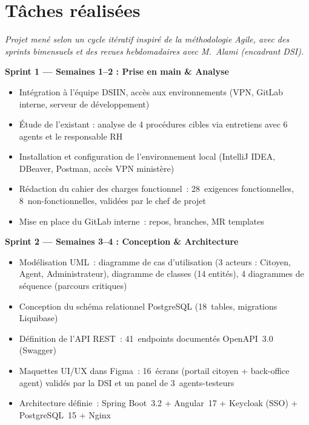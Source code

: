 \documentclass[a4paper,11pt]{article}
\begin{document}
\clearpage

\section{T\^{a}ches r\'{e}alis\'{e}es}
\label{sec:taches}

{\small\color{InstitGrey}\itshape
Projet men\'{e} selon un cycle it\'{e}ratif inspir\'{e} de la m\'{e}thodologie Agile,
avec des sprints bimensuels et des revues hebdomadaires avec M.~Alami (encadrant DSI).}

\vspace{0.8em}

\begin{mdframed}[style=SprintBox]
{\sffamily\bfseries\color{InstitBlue}
  Sprint 1 --- Semaines 1--2 : Prise en main \& Analyse}
\begin{itemize}
  \item Int\'{e}gration \`{a} l'\'{e}quipe DSIIN, acc\`{e}s aux environnements
        (VPN, GitLab interne, serveur de d\'{e}veloppement)
  \item \'{E}tude de l'existant : analyse de 4 proc\'{e}dures cibles via entretiens
        avec 6 agents et le responsable RH
  \item Installation et configuration de l'environnement local
        (IntelliJ IDEA, DBeaver, Postman, accès VPN ministère)
  \item R\'{e}daction du cahier des charges fonctionnel~:
        28~exigences fonctionnelles, 8~non-fonctionnelles, valid\'{e}es par le chef de projet
  \item Mise en place du GitLab interne~: repos, branches, MR templates
\end{itemize}
\end{mdframed}

\vspace{0.6em}

\begin{mdframed}[style=SprintBox]
{\sffamily\bfseries\color{InstitBlue}
  Sprint 2 --- Semaines 3--4 : Conception \& Architecture}
\begin{itemize}
  \item Mod\'{e}lisation UML~: diagramme de cas d'utilisation (3 acteurs : Citoyen,
        Agent, Administrateur), diagramme de classes (14 entit\'{e}s),
        4 diagrammes de s\'{e}quence (parcours critiques)
  \item Conception du sch\'{e}ma relationnel PostgreSQL (18~tables, migrations Liquibase)
  \item D\'{e}finition de l'API REST~: 41~endpoints document\'{e}s OpenAPI~3.0 (Swagger)
  \item Maquettes UI/UX dans Figma~: 16~\'{e}crans (portail citoyen + back-office agent)
        valid\'{e}s par la DSI et un panel de 3~agents-testeurs
  \item Architecture d\'{e}finie~: Spring Boot~3.2 + Angular~17 + Keycloak (SSO)
        + PostgreSQL~15 + Nginx
\end{itemize}
\end{mdframed}
\end{document}
